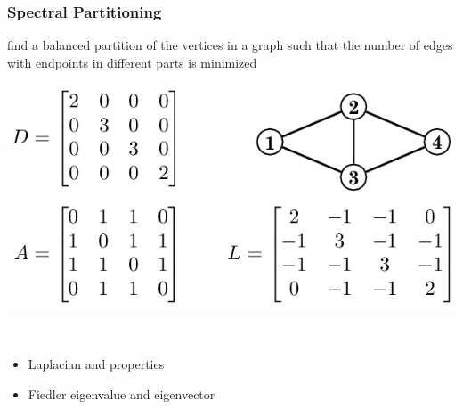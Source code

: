 \documentclass[titlepage,german,presentation]{beamer}
\begin{document}
\begin{frame}
  \frametitle{Spectral Partitioning}
  \begin{block}{}
   find a balanced partition of the vertices in a graph such that the number of edges with endpoints in different parts is minimized
    \end{block}
\begin{center}
\includegraphics[height=0.3\textwidth]{laplacian-2}\qquad \qquad
\end{center}
~\\
\begin{itemize}
\item Laplacian and properties~\cite{Bichot2013} %
\item Fiedler eigenvalue and eigenvector~\cite{Fiedler73}
\end{itemize}

\end{frame}
\end{document}
